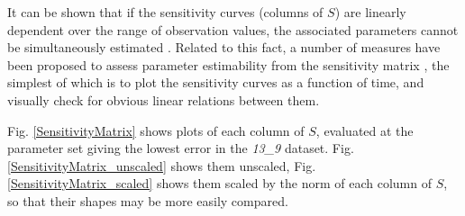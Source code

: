 \documentclass[10pt,journal]{./IEEE_latex_class/IEEEtran}
\begin{document}
It can be shown that if the sensitivity curves (columns of $S$) are linearly dependent over the range of observation values, the associated parameters cannot be simultaneously estimated \cite{Beck}. Related to this fact, a number of measures have been proposed to assess parameter estimability from the sensitivity matrix \cite{Mclean2012}, the simplest of which is to plot the sensitivity curves as a function of time, and visually check for obvious linear relations between them.

Fig. \ref{SensitivityMatrix} shows plots of each column of $S$, evaluated at the parameter set giving the lowest error in the \textit{13\_9} dataset. Fig. \ref{SensitivityMatrix_unscaled} shows them unscaled, Fig. \ref{SensitivityMatrix_scaled} shows them scaled by the norm of each column of $S$, so that their shapes may be more easily compared.
\end{document}
